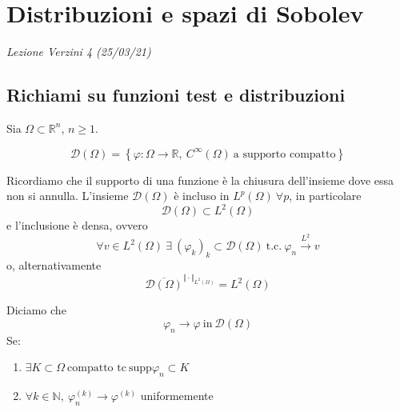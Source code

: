 \documentclass[10pt,a4paper,twoside,openright]{book}
\begin{document}
\chapter{Distribuzioni e spazi di Sobolev}
\textit{Lezione Verzini 4 (25/03/21)}
\section{Richiami su funzioni test e distribuzioni}

Sia $\displaystyle \Omega \subset \mathbb{R}^{n}$, $\displaystyle n\geqslant 1$. 
\begin{definition}
	\begin{equation*}
		\mathcal{D}( \Omega ) =\left\{\varphi :\Omega \rightarrow \mathbb{R} ,\ C^{\infty }( \Omega ) \ \text{a supporto compatto}\right\}
	\end{equation*}
\end{definition}
Ricordiamo che il supporto di una funzione è la chiusura dell'insieme dove essa non si annulla. L'insieme $\displaystyle \mathcal{D}( \Omega )$ è incluso in $\displaystyle L^{p}( \Omega ) \ \forall p$, in particolare
\begin{equation*}
	\mathcal{D}( \Omega ) \subset L^{2}( \Omega )
\end{equation*}
e l'inclusione è densa, ovvero
\begin{equation*}
	\forall v\in L^{2}( \Omega ) \ \exists \ ( \varphi _{k})_{k} \subset \mathcal{D}( \Omega ) \ \text{t.c.} \ \varphi _{n}\xrightarrow{L^{2}} v
\end{equation*}
o, alternativamente
\begin{equation*}
	\overline{\mathcal{D}( \Omega )}^{\Vert \cdotp \Vert _{L^{2}( \Omega )}} =L^{2}( \Omega )
\end{equation*}
\begin{definition}
	 Diciamo che 
	\begin{equation*}
		\varphi _{n}\rightarrow \varphi \ \text{in} \ \mathcal{D}( \Omega )
	\end{equation*}
	Se:
	\begin{enumerate}
		\item $\displaystyle \exists K\subset \Omega \ \text{compatto tc} \ \text{supp} \varphi _{n} \subset K$
		\item $\displaystyle \forall k\in \mathbb{N} ,\ \varphi ^{( k)}_{n}\rightarrow \varphi ^{( k)}$ uniformemente
	\end{enumerate}
\end{definition}
\end{document}
